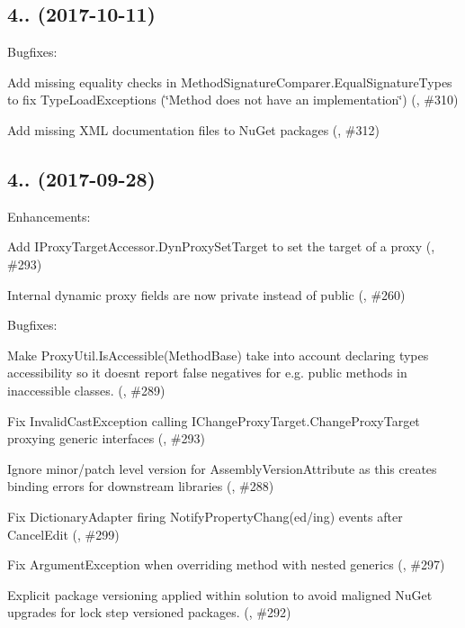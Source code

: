 \subsection*{4.. (2017-\/10-\/11)}

Bugfixes\+:
\begin{DoxyItemize}
\item Add missing equality checks in {\ttfamily Method\+Signature\+Comparer.\+Equal\+Signature\+Types} to fix {\ttfamily Type\+Load\+Exception}s (\char`\"{}\+Method does not have an implementation\char`\"{}) (, \#310)
\item Add missing X\+ML documentation files to Nu\+Get packages (, \#312)
\end{DoxyItemize}

\subsection*{4.. (2017-\/09-\/28)}

Enhancements\+:
\begin{DoxyItemize}
\item Add I\+Proxy\+Target\+Accessor.\+Dyn\+Proxy\+Set\+Target to set the target of a proxy (, \#293)
\item Internal dynamic proxy fields are now private instead of public (, \#260)
\end{DoxyItemize}

Bugfixes\+:
\begin{DoxyItemize}
\item Make Proxy\+Util.\+Is\+Accessible(\+Method\+Base) take into account declaring type\textquotesingle{}s accessibility so it doesn\textquotesingle{}t report false negatives for e.\+g. public methods in inaccessible classes. (, \#289)
\item Fix Invalid\+Cast\+Exception calling I\+Change\+Proxy\+Target.\+Change\+Proxy\+Target proxying generic interfaces (, \#293)
\item Ignore minor/patch level version for Assembly\+Version\+Attribute as this creates binding errors for downstream libraries (, \#288)
\item Fix Dictionary\+Adapter firing Notify\+Property\+Chang(ed/ing) events after Cancel\+Edit (, \#299)
\item Fix Argument\+Exception when overriding method with nested generics (, \#297)
\item Explicit package versioning applied within solution to avoid maligned Nu\+Get upgrades for lock step versioned packages. (, \#292)
\end{DoxyItemize}

